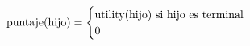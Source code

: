\documentclass[preview]{standalone}
\begin{document}
\begin{align*}
\text{puntaje(hijo)} =  \begin{cases}\text{utility(hijo) si hijo es terminal} \cr
                                 0 \cr
                                 \end{cases}
\end{align*}
\end{document}
